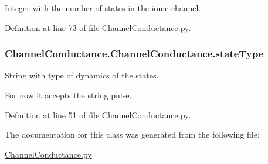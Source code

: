 Integer with the number of states in the ionic channel. 



Definition at line 73 of file Channel\+Conductance.\+py.

\subsubsection[{\texorpdfstring{state\+Type}{stateType}}]{\setlength{\rightskip}{0pt plus 5cm}Channel\+Conductance.\+Channel\+Conductance.\+state\+Type}\hypertarget{class_channel_conductance_1_1_channel_conductance_aa3c889bb4528c3abe7b69862cf87119d}{}\label{class_channel_conductance_1_1_channel_conductance_aa3c889bb4528c3abe7b69862cf87119d}


String with type of dynamics of the states. 

For now it accepts the string pulse. 

Definition at line 51 of file Channel\+Conductance.\+py.



The documentation for this class was generated from the following file\+:\begin{DoxyCompactItemize}
\item 
\hyperlink{_channel_conductance_8py}{Channel\+Conductance.\+py}\end{DoxyCompactItemize}
